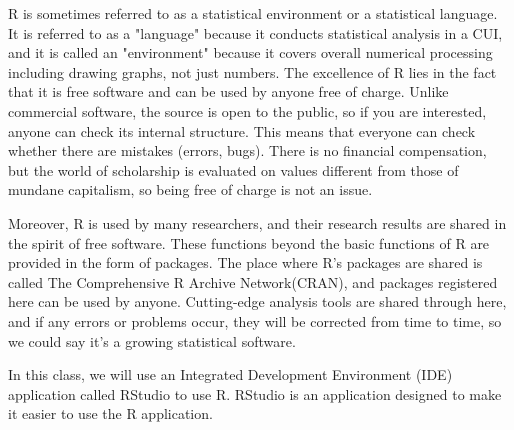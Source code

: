 \documentclass{ltjsbook}
\begin{document}
R is sometimes referred to as a statistical environment or a statistical language. It is referred to as a "language" because it conducts statistical analysis in a CUI, and it is called an "environment" because it covers overall numerical processing including drawing graphs, not just numbers. The excellence of R lies in the fact that it is free software and can be used by anyone free of charge. Unlike commercial software, the source is open to the public, so if you are interested, anyone can check its internal structure. This means that everyone can check whether there are mistakes (errors, bugs). There is no financial compensation, but the world of scholarship is evaluated on values different from those of mundane capitalism, so being free of charge is not an issue.

Moreover, R is used by many researchers, and their research results are shared in the spirit of free software. These functions beyond the basic functions of R are provided in the form of packages. The place where R's packages are shared is called The Comprehensive R Archive Network(CRAN), and packages registered here can be used by anyone. Cutting-edge analysis tools are shared through here, and if any errors or problems occur, they will be corrected from time to time, so we could say it's a growing statistical software.

In this class, we will use an Integrated Development Environment (IDE) application called RStudio to use R. RStudio is an application designed to make it easier to use the R application.
\end{document}
